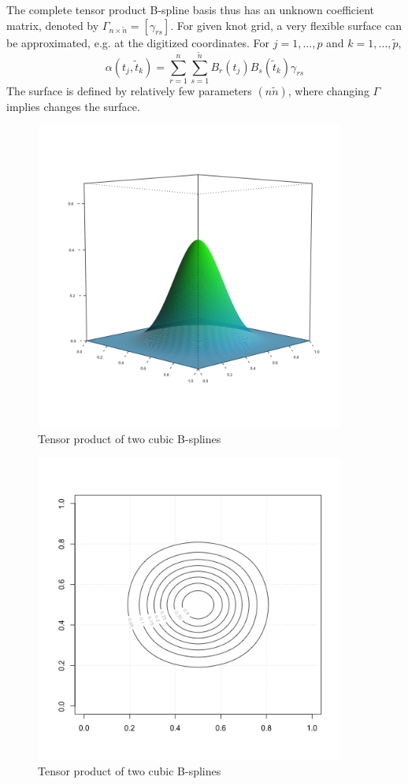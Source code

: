 \documentclass[12pt]{article}
\begin{document}
The complete tensor product B-spline basis thus has an unknown coefficient matrix, denoted by $\Gamma_{n\times\tilde{n}} = \left[\gamma_{rs}\right]$. For given knot grid, a very flexible surface can be approximated, e.g. at the digitized coordinates. For $j=1,\dots,p$ and $k=1,\dots,\tilde{p}$,
\begin{equation} \label{eq:coefficient_surface_expansion}
\alpha\left(t_{j}, \tilde{t}_{k}\right) = \sum_{r=1}^n \sum_{s=1}^{\tilde{n}}  B_r\left(t_{j}\right) B_s\left(\tilde{t}_{k}\right) \gamma_{rs}
\end{equation}
\noindent
The surface is defined by relatively few parameters $\left(n \tilde{n} \right)$, where changing $\Gamma$ implies changes the surface.

\begin{figure}[H]
  \centering
 \graphicspath{{img/}}
  \includegraphics[width=4in, height=4in]{bicubic_bspline.png}
  \caption{Tensor product of two cubic B-splines}\label{fig:bicubic_bspline}
\end{figure}

\begin{figure}[H]
  \centering
  \graphicspath{{img/}}
  \includegraphics[width=4in, height=4in]{bicubic_bspline_contour.png}
  \caption{Tensor product of two cubic B-splines}\label{fig:bicubic_bspline_contour}
\end{figure}
\end{document}
